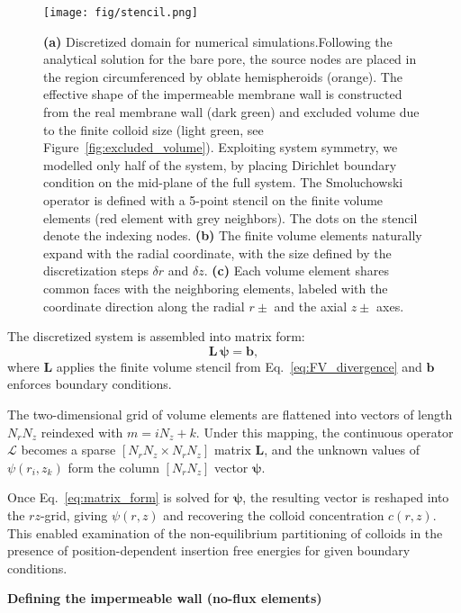 \documentclass[10pt, a4paper, twocolumn]{article}
\begin{document}
\begin{figure}[]
    \texttt{[image: fig/stencil.png]}
    \caption{
        \textbf{(a)} Discretized domain for numerical simulations.Following the analytical solution for the bare pore, the source nodes are placed in the region circumferenced by oblate hemispheroids (orange).
        The effective shape of the impermeable membrane wall is constructed from the real membrane wall (dark green) and excluded volume due to the finite colloid size (light green, see Figure~\ref{fig:excluded_volume}).
        Exploiting system symmetry, we modelled only half of the system, by placing Dirichlet boundary condition on the mid-plane  of the full system.
        The Smoluchowski operator is defined with a 5-point stencil on the finite volume elements (red element with grey neighbors).
        The dots on the stencil denote the indexing nodes.
        \textbf{(b)} The finite volume elements naturally expand with the radial coordinate, with the size defined by the discretization steps $\delta r$ and $\delta z$.
        \textbf{(c)} Each volume element shares common faces with the neighboring elements, labeled with the coordinate direction along the radial $r \pm$ and the axial $z\pm$ axes.
  }
  \label{fig:stencil}
\end{figure}

The discretized system is assembled into matrix form:
\begin{equation}
  \mathbf L\, \bm{\psi}=\bm b,
  \label{eq:matrix_form}
\end{equation}
where $\mathbf{L}$ applies the finite volume stencil from Eq.~\eqref{eq:FV_divergence} and $\bm b$ enforces boundary conditions.

The two-dimensional grid of volume elements are flattened into vectors of length $N_rN_z$ reindexed with $m=iN_z+k$.
Under this mapping, the continuous operator $\mathcal L$ becomes a sparse $[N_rN_z\times N_rN_z]$ matrix $\mathbf L$, and the unknown values of $\psi(r_i, z_k)$ form the column $[N_rN_z]$ vector $\bm{\psi}$.

Once Eq.~\eqref{eq:matrix_form} is solved for $\bm{\psi}$, the resulting vector is reshaped into the $rz$-grid, giving $\psi(r,z)$ and recovering the colloid concentration $c(r,z)$.
This enabled examination of the non-equilibrium partitioning of colloids in the presence of position-dependent insertion free energies for given boundary conditions.

\bigskip
\textbf{Defining the impermeable wall (no-flux elements)}
\end{document}
